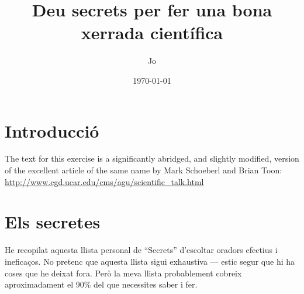 \documentclass[12pt]{article}
\title{Deu secrets per fer una bona xerrada científica}
\author{Jo}
\date{\today}
\begin{document}
\maketitle

\section{Introducció}

The text for this exercise is a significantly abridged, and slightly modified, version of the excellent article of the same name by Mark Schoeberl and Brian Toon:
\url{http://www.cgd.ucar.edu/cms/agu/scientific_talk.html}

\section{Els secretes}

He recopilat aquesta llista personal de ``Secrets'' d'escoltar oradors efectius i ineficaços. No pretenc que aquesta llista sigui exhaustiva --- estic segur que hi ha coses que he deixat fora. Però la meva llista probablement cobreix aproximadament el 90\% del que necessites saber i fer.
\end{document}
